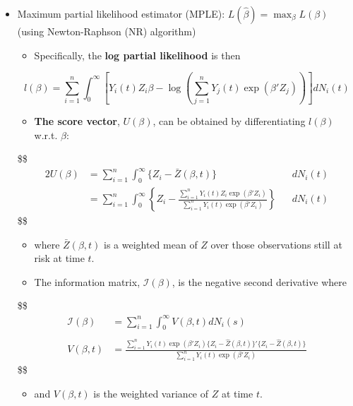 \documentclass[
]{book}
\providecommand{\tightlist}{%
  \setlength{\itemsep}{0pt}\setlength{\parskip}{0pt}}
\theoremstyle{definition}
\theoremstyle{definition}
\theoremstyle{definition}
\theoremstyle{definition}
\theoremstyle{remark}
\begin{document}
\begin{itemize}
\item
  Maximum partial likelihood estimator (MPLE): \(L( \hat \beta) = \max_\beta L(\beta)\) (using Newton-Raphson (NR) algorithm)

  \begin{itemize}
  \tightlist
  \item
    Specifically, the \textbf{log partial likelihood} is then
  \end{itemize}

  \[
  l(\beta) = \sum_{i=1}^n \int_0^\infty \left[ Y_i (t) Z_i \beta - \log\left( \sum_{j=1}^n Y_j(t) \exp(\beta ' Z_j ) \right) \right]dN_i(t)
  \]

  \begin{itemize}
  \tightlist
  \item
    \textbf{The score vector}, \(U(\beta)\), can be obtained by differentiating \(l(\beta)\) w.r.t. \(\beta\):
  \end{itemize}

  \$\$
  \begin{alignat}{2}
  U(\beta) &= \sum_{i=1}^n \int_0^\infty \Big \{ Z_i - \bar Z(\beta, t) \Big \}&&dN_i (t)

  \\

  &= \sum_{i=1}^n \int_0^\infty \left \{ Z_i - \frac{\sum_{i=1}^n Y_i (t) Z_i \exp(\beta ' Z_i)}{\sum_{i=1}^n Y_i (t) \exp(\beta ' Z_i)} \right \}&&dN_i (t)

  \end{alignat}
  \$\$

  \begin{itemize}
  \item
    where \(\bar Z(\beta, t)\) is a weighted mean of \(Z\) over those observations still at risk at time \(t\).
  \item
    The information matrix, \(\mathcal I(\beta)\), is the negative second derivative where
  \end{itemize}

  \$\$
  \begin{align}

  \mathcal I(\beta) &= \sum\limits_{i=1}^n \int_0^\infty V(\beta, t) dN_i(s)

  \\
  \\

  V(\beta, t) &= \frac{\sum\limits_{i=1}^n Y_i(t) \exp(\beta ' Z_i ) \Big \{ Z_i - \hat Z (\beta, t)\Big\}'\Big \{ Z_i - \hat Z (\beta, t)\Big\}}{\sum\limits_{i=1}^n Y_i(t) \exp(\beta ' Z_i )}

  \end{align}
  \$\$

  \begin{itemize}
  \tightlist
  \item
    and \(V(\beta, t)\) is the weighted variance of \(Z\) at time \(t\).
  \end{itemize}
\end{itemize}
\end{document}
